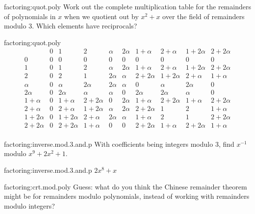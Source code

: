 \begin{problem}{factoring:quot.poly}
Work out the complete multiplication table for the remainders of polynomials in \(x\) when we quotient out by \(x^2+x\) over the field of remainders modulo 3.
Which elements have reciprocals?
\end{problem}
\begin{answer}{factoring:quot.poly}
\[
\begin{array}{c|ccccccccc}
          &
0         &
1         &
2         & 
\alpha    &
2\alpha   &
1+\alpha  &
2+\alpha  &
1+2\alpha &
2+2\alpha \\
\hline
0         & 0 & 0 & 0 & 0 & 0 & 0 & 0 & 0 & 0 
\\
1         &
0         &
1         &
2         & 
\alpha    &
2\alpha   &
1+\alpha  &
2+\alpha  &
1+2\alpha &
2+2\alpha \\
2         &
0         &
2         &
1         & 
2\alpha    &
\alpha   &
2+2\alpha  &
1+2\alpha  &
2+\alpha &
1+\alpha 
\\
\alpha    &
0         &
\alpha    &
2\alpha   & 
2\alpha   &
 \alpha   &
0  &
\alpha  &
2\alpha &
0 \\
2\alpha   &
0         &
2\alpha   &
\alpha    & 
\alpha    &  
0         &
2\alpha   &
2\alpha   &
\alpha    &
0 \\
1+\alpha   &
0          &
1+\alpha   &
2+2\alpha  & 
0          &  
2\alpha    &
1+\alpha   &
2+2\alpha  &
1+\alpha   &
2+2\alpha \\
2+\alpha   &
0          &
2+\alpha   &
1+2\alpha  & 
\alpha          &  
2\alpha    &
2+2\alpha   &
1  &
2   &
1+\alpha \\
1+2\alpha   &
0          &
1+2\alpha   &
2+\alpha  & 
2\alpha         &  
\alpha  &
1+\alpha   &
2 &
1  &
2+2\alpha \\
2+2\alpha   &
0          &
2+2\alpha   &
1+\alpha  & 
0          &  
0    &
2+2\alpha   &
1+\alpha  &
2+2\alpha   &
1+\alpha   \\
\end{array}
\]
\end{answer}

\begin{problem}{factoring:inverse.mod.3.and.p}
With coefficients being integers modulo 3, find \(x^{-1}\) modulo \(x^9+2x^2+1\).
\end{problem}
\begin{answer}{factoring:inverse.mod.3.and.p}
\(2x^8+x\)
\end{answer}

\begin{problem}{factoring:crt.mod.poly}
Guess: what do you think the Chinese remainder theorem might be for remainders modulo polynomials, instead of working with remainders modulo integers?
\end{problem}


